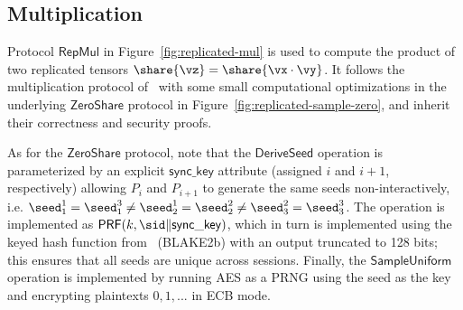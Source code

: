 \subsection{Multiplication}

Protocol $\mathsf{RepMul}$ in Figure~\ref{fig:replicated-mul} is used to compute the product of two replicated tensors $\share{\vz} = \share{\vx \cdot \vy}$. It follows the multiplication protocol of~\cite{CCS:AFLNO16} with some small computational optimizations in the underlying $\mathsf{ZeroShare}$ protocol in Figure~\ref{fig:replicated-sample-zero}, and inherit their correctness and security proofs.

As for the $\mathsf{ZeroShare}$ protocol, note that the $\mathsf{DeriveSeed}$
operation is parameterized by an explicit $\mathsf{sync\_key}$ attribute
(assigned $i$ and $i+1$, respectively) allowing $P_i$ and $P_{i+1}$ to generate
the same seeds non-interactively, i.e. $\seed^1_1 = \seed^3_1 \not = \seed^1_2 =
\seed^2_2 \not = \seed^2_3 = \seed^3_3$. The operation is implemented as
$\mathsf{PRF}(k, \sid \| \mathsf{sync\_key})$, which in turn is implemented
using the keyed hash function from~\cite{libsodium} (BLAKE2b) with an output
truncated to 128 bits; this ensures that all seeds are unique across sessions.
Finally, the $\mathsf{SampleUniform}$ operation is implemented by running AES as
a PRNG using the seed as the key and encrypting plaintexts $0, 1, ...$ in ECB
mode.

